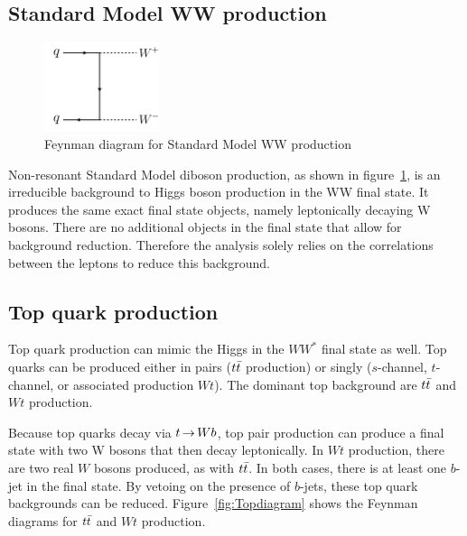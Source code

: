 \subsection{Standard Model WW production}

\begin{figure}[h!]
  \centering
  \captionsetup{justification=centering}

  \includegraphics[width=0.3\textwidth]{figures/Feyn_SMWW}
  \caption{Feynman diagram for Standard Model WW production}
  \label{fig:SMWWdiagram}
\end{figure}

Non-resonant Standard Model diboson production, as shown in figure~\ref{fig:SMWWdiagram}, is an irreducible background to Higgs boson production in the WW final state. It produces the same exact final state objects, namely leptonically decaying W bosons. There are no additional objects in the final state that allow for background reduction. Therefore the analysis solely relies on the correlations between the leptons to reduce this background. 

\subsection{Top quark production}

Top quark production can mimic the Higgs in the $WW^*$ final state as well. Top quarks can be produced either in pairs ($t\bar{t}$ production) or singly ($s$-channel, $t$-channel, or associated production $Wt$). The dominant top background are $t\bar{t}$ and $Wt$ production.

Because top quarks decay via $t\,{\rightarrow}\, Wb$, top pair production can produce a final state with two W bosons that then decay leptonically. In $Wt$ production, there are two real $W$ bosons produced, as with $t\bar{t}$. In both cases, there is at least one $b$-jet in the final state. By vetoing on the presence of $b$-jets, these top quark backgrounds can be reduced. Figure~\ref{fig:Topdiagram} shows the Feynman diagrams for $t\bar{t}$ and $Wt$ production.  

